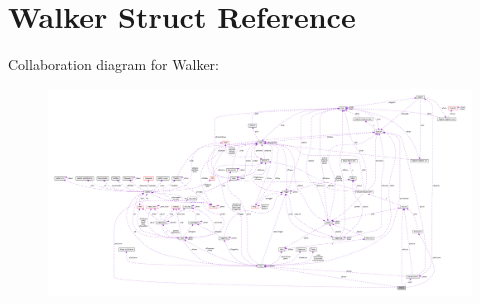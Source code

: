 \hypertarget{structWalker}{}\section{Walker Struct Reference}
\label{structWalker}


Collaboration diagram for Walker\+:\nopagebreak
\begin{figure}[H]
\begin{center}
\leavevmode
\includegraphics[width=350pt]{structWalker__coll__graph}
\end{center}
\end{figure}
